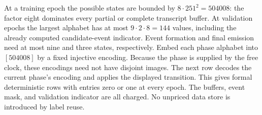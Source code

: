 At a training epoch the possible states are bounded by
$8\cdot251^2=504008$: the factor eight dominates every partial or complete
transcript buffer. At validation epochs the largest alphabet has at most
$9\cdot2\cdot8=144$ values, including the already computed
candidate-event indicator. Event formation and final emission need at
most nine and three states, respectively. Embed each phase alphabet into
$[504008]$ by a fixed injective encoding. Because the phase is supplied by
the free clock, these encodings need not have disjoint images. The next
row decodes the current phase's encoding and applies the displayed
transition. This gives formal deterministic rows with entries zero or
one at every epoch. The buffers, event mask, and validation indicator are
all charged. No unpriced data store is introduced by label reuse.
